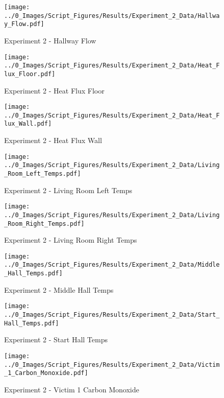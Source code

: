 	\clearpage

	\begin{figure}[H]
		\centering
		\texttt{[image: ../0\_Images/Script\_Figures/Results/Experiment\_2\_Data/Hallway\_Flow.pdf]}
		\caption[]{Experiment 2 - Hallway Flow}
	\end{figure}
 

	\begin{figure}[H]
		\centering
		\texttt{[image: ../0\_Images/Script\_Figures/Results/Experiment\_2\_Data/Heat\_Flux\_Floor.pdf]}
		\caption[]{Experiment 2 - Heat Flux Floor}
	\end{figure}
 
	\clearpage

	\begin{figure}[H]
		\centering
		\texttt{[image: ../0\_Images/Script\_Figures/Results/Experiment\_2\_Data/Heat\_Flux\_Wall.pdf]}
		\caption[]{Experiment 2 - Heat Flux Wall}
	\end{figure}
 

	\begin{figure}[H]
		\centering
		\texttt{[image: ../0\_Images/Script\_Figures/Results/Experiment\_2\_Data/Living\_Room\_Left\_Temps.pdf]}
		\caption[]{Experiment 2 - Living Room Left Temps}
	\end{figure}
 
	\clearpage

	\begin{figure}[H]
		\centering
		\texttt{[image: ../0\_Images/Script\_Figures/Results/Experiment\_2\_Data/Living\_Room\_Right\_Temps.pdf]}
		\caption[]{Experiment 2 - Living Room Right Temps}
	\end{figure}
 

	\begin{figure}[H]
		\centering
		\texttt{[image: ../0\_Images/Script\_Figures/Results/Experiment\_2\_Data/Middle\_Hall\_Temps.pdf]}
		\caption[]{Experiment 2 - Middle Hall Temps}
	\end{figure}
 
	\clearpage

	\begin{figure}[H]
		\centering
		\texttt{[image: ../0\_Images/Script\_Figures/Results/Experiment\_2\_Data/Start\_Hall\_Temps.pdf]}
		\caption[]{Experiment 2 - Start Hall Temps}
	\end{figure}
 

	\begin{figure}[H]
		\centering
		\texttt{[image: ../0\_Images/Script\_Figures/Results/Experiment\_2\_Data/Victim\_1\_Carbon\_Monoxide.pdf]}
		\caption[]{Experiment 2 - Victim 1 Carbon Monoxide}
	\end{figure}
 
